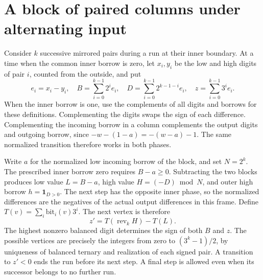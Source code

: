 \documentclass[11pt]{article}
\newcommand{\rev}{\operatorname{rev}}
\begin{document}
\section{A block of paired columns under alternating input}
Consider $k$ successive mirrored pairs during a run at their inner boundary. At a time when the common inner borrow is zero, let $x_i,y_i$ be the low and high digits of pair $i$, counted from the outside, and put
\[
 e_i=x_i-y_i,\quad B=\sum_{i=0}^{k-1}2^i e_i,\quad
 D=\sum_{i=0}^{k-1}2^{k-1-i}e_i,\quad z=\sum_{i=0}^{k-1}3^i e_i.
\]
When the inner borrow is one, use the complements of all digits and borrows for these definitions. Complementing the digits swaps the sign of each difference. Complementing the incoming borrow in a column complements the output digits and outgoing borrow, since $-w-(1-a)=-(w-a)-1$. The same normalized transition therefore works in both phases.

Write $a$ for the normalized low incoming borrow of the block, and set $N=2^k$. The prescribed inner borrow zero requires $B-a\ge0$. Subtracting the two blocks produces low value $L=B-a$, high value $H=(-D)\bmod N$, and outer high borrow $h=\mathbf 1_{D>0}$. The next step has the opposite inner phase, so the normalized differences are the negatives of the actual output differences in this frame. Define $T(v)=\sum_{i}\mathrm{bit}_i(v)3^i$. The next vertex is therefore
\begin{equation}\label{eq:trans}
 z'=T(\rev_k H)-T(L).
\end{equation}
The highest nonzero balanced digit determines the sign of both $B$ and $z$. The possible vertices are precisely the integers from zero to $(3^k-1)/2$, by uniqueness of balanced ternary and realization of each signed pair. A transition to $z'<0$ ends the run before its next step. A final step is allowed even when its successor belongs to no further run.
\end{document}
